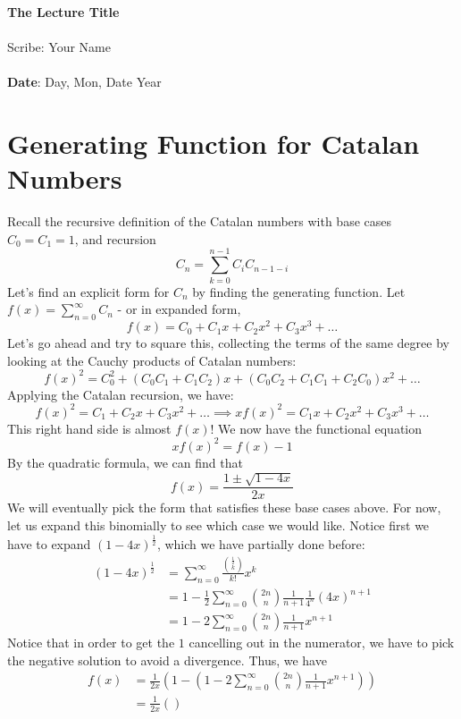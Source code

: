\documentclass[11pt,twosided]{article}
\def\titlestring{The Lecture Title}
\def\scribestring{Your Name}
\def\datestring{Day, Mon, Date Year}
\begin{document}
\thispagestyle{plain}  %

\noindent
{\LARGE \textbf{\titlestring}}\\\\
%
{\Large Scribe: \scribestring}\\ \\
{\textbf{Date}: \datestring}


\noindent

\section{Generating Function for Catalan Numbers}
Recall the recursive definition of the Catalan numbers with base cases $C_0 = C_1 = 1$, and recursion
\[
	C_n = \sum_{k=0}^{n-1} C_i C_{n-1-i}
\]
Let's find an explicit form for $C_n$ by finding the generating function. Let $f(x) = \sum_{n=0}^\infty C_n$ - or in expanded form, 
\[
	f(x) = C_0 + C_1x + C_2x^2 + C_3x^3 + \ldots
\]
Let's go ahead and try to square this, collecting the terms of the same degree by looking at the Cauchy products of Catalan numbers: 
\[
	f(x)^2 = C_0^2 + (C_0C_1 + C_1C_2)x + (C_0C_2 + C_1C_1 + C_2C_0)x^2 + \ldots
\]
Applying the Catalan recursion, we have: 
\[
	f(x)^2 = C_1 + C_2 x + C_3 x^2 + \ldots \implies x f(x)^2 = C_1 x + C_2x^2 + C_3x^3 + \ldots 
\]
This right hand side is almost $f(x)$! We now have the functional equation
\[
	xf(x)^2  = f(x) - 1
\]
By the quadratic formula, we can find that 
\[
	f(x) = \frac{1 \pm \sqrt{1- 4x}}{2x}
\]
We will eventually pick the form that satisfies these base cases above. For now, let us expand this binomially to see which case we would like. Notice first we have to expand $(1-4x)^\frac{1}{2}$, which we have partially done before: 
\begin{align*}
(1-4x)^\frac{1}{2} &= \sum_{n=0}^\infty \frac{\binom{\frac{1}{2}}{k}}{k!} x^k \\
&= 1 - \frac{1}{2} \sum_{n=0}^\infty\binom{2n}{n}\frac{1}{n+1} \frac{1}{4^n} (4x)^{n+1} \\
&= 1 - 2 \sum_{n=0}^\infty\binom{2n}{n}\frac{1}{n+1}x^{n+1} 
\end{align*}
Notice that in order to get the $1$ cancelling out in the numerator, we have to pick the negative solution to avoid a divergence. Thus, we have 
\begin{align*}
f(x) &= \frac{1}{2x}\left(1 - \left(1 - 2 \sum_{n=0}^\infty\binom{2n}{n}\frac{1}{n+1}x^{n+1}  \right)  \right) \\
&= \frac{1}{2x}\left( \right) 
\end{align*}
\end{document}
